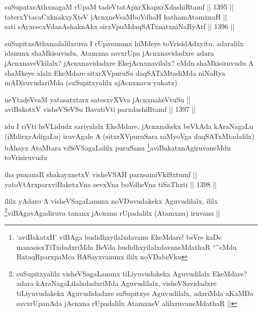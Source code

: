 \begin{shl}
suSupatxsAthxnagaM rUpaM tadeVtatApxrXkapxrXdashiRtamf \hfill || 1395 ||  \\
taterxYtacaCxknakxyXteV jAcnxneV\s saMboVdhaH kathamAtamxnaH || \\
sati sAyxcecxVdanAshaknAkx sirxVpuMdaqSATxnatxniNaRyAtf \hfill || 1396 ||  
\end{shl}

\begin{artha}
suSupitxsAthxnadalilxruva I rUpavanunx hiMdeye toVrisidAdxyitu, adaralilx idanunx shaMkisuvudu, Atamxna savxrUpa jAcnxnavidadxre adara jAcnxnaveVkilalx? jAcnxnavidadxre EkejAcnxnavilalx? eMdu shaMkisiruvudu A shaMkeye alalx EkeMdare sitxrXVpuruSa daqSATxMtadiMda niNaRya mADiruvudariMda (suSupitxyalilx ajAcnxnavu yukatx)
\end{artha}


\begin{shl}
neYtadeVvaM yatasatxtarx satesxvXVva jAcnxnaheVtuSu || \\
aviBakotxV visheVSeVSu BavatiVti parxdashiRtamf \hfill || 1397 ||  
\end{shl}

\begin{artha}
idu I riVti heVLidudx sariyalalx EkeMdare, jAcnxnakekx beVkAda kAraNagaLu (iMdirxyAdigaLu) iruvAgale A (sitxrXVpuruSara saMyoVga daqSATxMtadalilx) bAhayx AtaMtara viSeVSagaLalilx puruSanu \footnote{`aviBakatxH' viBAga budidhxyilalxdavanu EkeMdare! beVre kaDe manasisxTiTxdadxriMda BeVda budidhxyilalxdavaneMdathaR ``\stext''eMdu BataqRparxpaMca BASayxvanunx ililx noVDabeVku}aviBakatxnAgiruvaneMdu toVrisiruvudu
\end{artha}

\begin{shl}
iha punanaR shakayxnetxV visheVSAH parxsamiVkiSxtumf || \\
yatoV\s tArxparxviBaketxVna sevxVna boVdheVna tiSaThxti \hfill || 1398 ||  
\end{shl}

\begin{artha}
ililx yAdaro A visheVSagaLanunx noVDuvudakekx Aguvudilalx, ililx \footnote{suSupitxyalilx visheVSagaLanunx tiLiyuvudakekx Aguvudilalx EkeMdare? adara kAraNagaLilalxdadxriMda Aguvudilalx, visheVSavidadxre tiLiyuvudakekx Aguvudidadxre suSupitxye Aguvudilalx, adariMda aKaMDa savxrUpanAda jAcnxna rUpadalilx AtamxneV alilxruvaneMdathaR ||}viBAgavAgadiruva tananx jAcnxna rUpadalilx (Atamxnu) iruvanu ||
\end{artha}

